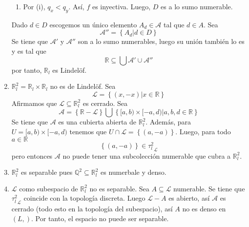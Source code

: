 \documentclass[12pt]{report}
\theoremstyle{largebreak}
\begin{document}
\begin{exa}
\begin{enumerate}
\begin{enumerate}
                \item Por (i), $q_x<q_y$. Así, $f$ es inyectiva. Luego, $D$ es a lo sumo numerable.
            \end{enumerate}
            Dado $d\in D$ escogemos un único elemento $A_d\in\mathcal{A}$ tal que $d\in A$. Sea
            \begin{equation*}
                \mathcal{A}''=\left\{A_d\Big|d\in D \right\}
            \end{equation*}
            Se tiene que $\mathcal{A}'$ y $\mathcal{A}''$ son a lo sumo numerables, luego su unión también lo es y es tal que
            \begin{equation*}
                \mathbb{R}\subseteq \bigcup\mathcal{A}'\cup\mathcal{A}''
            \end{equation*}
            por tanto, $\mathbb{R}_l$ es Lindelöf.
            \item $\mathbb{R}_l^2=\mathbb{R}_l\times\mathbb{R}_l$ no es de Lindelöf. Sea
            \begin{equation*}
                \mathcal{L}=\left\{(x,-x)\Big|x\in\mathbb{R} \right\}
            \end{equation*}
            Afirmamos que $\mathcal{L}\subseteq \mathbb{R}_l^2$ es cerrado. Sea
            \begin{equation*}
                \mathcal{A}=\left\{\mathbb{R}-\mathcal{L} \right\}\bigcup\left\{[a,b)\times[-a,d)\Big|a,b,d\in\mathbb{R} \right\}
            \end{equation*}
            Se tiene que $\mathcal{A}$ es una cubierta abierta de $\mathbb{R}_l^2$.
            Además, para $U=[a,b)\times[-a,d)$ tenemos que $U\cap\mathcal{L}=\left\{(a,-a) \right\}$. Luego, para todo $a\in\mathbb{R}$
            \begin{equation*}
                \left\{(a,-a) \right\}\in{\tau_l^2}_{\mathcal{L}}
            \end{equation*}
            pero entonces $\mathcal{A}$ no puede tener una subcolección numerable que cubra a $\mathbb{R}_l^2$.
            \item $\mathbb{R}_l^2$ es separable pues $\mathbb{Q}^2\subseteq\mathbb{R}_l^2$ es numerbale y denso.
            \item $\mathcal{L}$ como subespacio de $\mathbb{R}_l^2$ no es separable. Sea $A\subseteq\mathcal{L}$ numerable. Se tiene que ${\tau_l^2}_{\mathcal{L}}$ coincide con la topología discreta. Luego $\mathcal{L}-A$ es abierto, así $\mathcal{A}$ es cerrado (todo esto en la topología del subespacio), así $A$ no es denso en $(L,)$. Por tanto, el espacio no puede ser separable.
        \end{enumerate}
    \end{exa}
\end{document}
